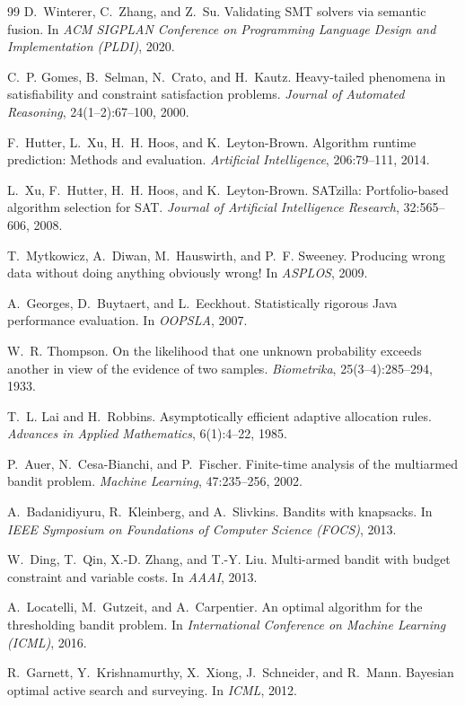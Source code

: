 \documentclass[11pt]{article}
\begin{document}
\begin{thebibliography}{99}
 D.~Winterer, C.~Zhang, and Z.~Su. Validating SMT solvers via semantic fusion. In \emph{ACM SIGPLAN Conference on Programming Language Design and Implementation (PLDI)}, 2020.

 C.~P. Gomes, B.~Selman, N.~Crato, and H.~Kautz. Heavy-tailed phenomena in satisfiability and constraint satisfaction problems. \emph{Journal of Automated Reasoning}, 24(1--2):67--100, 2000.

 F.~Hutter, L.~Xu, H.~H. Hoos, and K.~Leyton-Brown. Algorithm runtime prediction: Methods and evaluation. \emph{Artificial Intelligence}, 206:79--111, 2014.

 L.~Xu, F.~Hutter, H.~H. Hoos, and K.~Leyton-Brown. SATzilla: Portfolio-based algorithm selection for SAT. \emph{Journal of Artificial Intelligence Research}, 32:565--606, 2008.

 T.~Mytkowicz, A.~Diwan, M.~Hauswirth, and P.~F. Sweeney. Producing wrong data without doing anything obviously wrong! In \emph{ASPLOS}, 2009.

 A.~Georges, D.~Buytaert, and L.~Eeckhout. Statistically rigorous Java performance evaluation. In \emph{OOPSLA}, 2007.

 W.~R. Thompson. On the likelihood that one unknown probability exceeds another in view of the evidence of two samples. \emph{Biometrika}, 25(3--4):285--294, 1933.

 T.~L. Lai and H.~Robbins. Asymptotically efficient adaptive allocation rules. \emph{Advances in Applied Mathematics}, 6(1):4--22, 1985.

 P.~Auer, N.~Cesa-Bianchi, and P.~Fischer. Finite-time analysis of the multiarmed bandit problem. \emph{Machine Learning}, 47:235--256, 2002.

 A.~Badanidiyuru, R.~Kleinberg, and A.~Slivkins. Bandits with knapsacks. In \emph{IEEE Symposium on Foundations of Computer Science (FOCS)}, 2013.

 W.~Ding, T.~Qin, X.-D. Zhang, and T.-Y. Liu. Multi-armed bandit with budget constraint and variable costs. In \emph{AAAI}, 2013.

 A.~Locatelli, M.~Gutzeit, and A.~Carpentier. An optimal algorithm for the thresholding bandit problem. In \emph{International Conference on Machine Learning (ICML)}, 2016.

 R.~Garnett, Y.~Krishnamurthy, X.~Xiong, J.~Schneider, and R.~Mann. Bayesian optimal active search and surveying. In \emph{ICML}, 2012.


\end{thebibliography}
\end{document}
